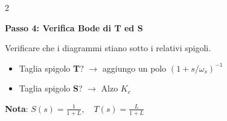 \documentclass[10pt,a4paper]{article}
\newcommand{\sub}[1]{\smallskip\noindent\textbf{#1}\par\nobreak}
\begin{document}
\begin{center}
{{\begin{multicols}{2}
\begin{minipage}{\columnwidth}
\sub{Passo 4: Verifica Bode di T ed S}
Verificare che i diagrammi stiano sotto i relativi spigoli.
\begin{itemize}[leftmargin=12pt, nosep, before=\vspace{-2pt}, after=\vspace{-2pt}]
    \item[a.] Taglia spigolo \textbf{T}? $\rightarrow$ aggiungo un polo $(1 + s/\omega_s)^{-1}$
    \item[b.] Taglia spigolo \textbf{S}? $\rightarrow$ Alzo $K_c$
\end{itemize}
\vspace{2pt}
\textbf{Nota}: $S(s) = \frac{1}{1+L}, \quad T(s) = \frac{L}{1+L}$
\end{minipage}

\end{multicols}
}}
\end{center}

\vspace{-1.5mm} %
\end{document}
